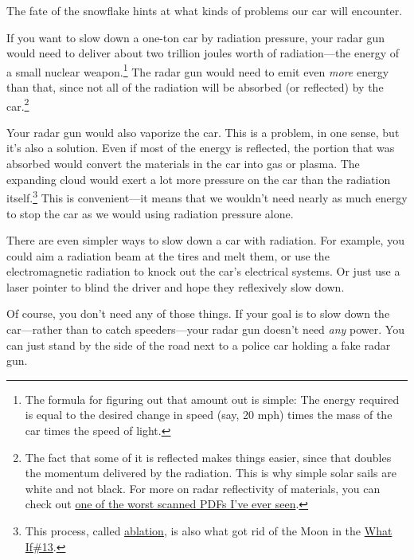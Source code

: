 {{The fate of the snowflake hints at what kinds of problems our car will encounter.}

{If you want to slow down a one-ton car by radiation pressure, your radar gun would need to deliver about two trillion joules worth of radiation—the energy of a small nuclear weapon.{\footnote{The formula for figuring out that amount out is simple: The energy required is equal to the desired change in speed (say, 20 mph) times the mass of the car times the speed of light.} } The radar gun would need to emit even \emph{more} energy than that, since not all of the radiation will be absorbed (or reflected) by the car.{\footnote{The fact that some of it is reflected makes things easier, since that doubles the momentum delivered by the radiation. This is why simple solar sails are white and not black. For more on radar reflectivity of materials, you can check out \href{http://www.dtic.mil/dtic/tr/fulltext/u2/601365.pdf}{one of the worst scanned PDFs I've ever seen}.} } }

{Your radar gun would also vaporize the car. This is a problem, in one sense, but it's also a solution. Even if most of the energy is reflected, the portion that was absorbed would convert the materials in the car into gas or plasma. The expanding cloud would exert a lot more pressure on the car than the radiation itself.{\footnote{This process, called \href{https://en.wikipedia.org/wiki/Laser\_ablation}{ablation}, is also what got rid of the Moon in the \href{http://what-if.xkcd.com/13/} {What If\#13}.} } This is convenient—it means that we wouldn't need nearly as much energy to stop the car as we would using radiation pressure alone.}

{There are even simpler ways to slow down a car with radiation. For example, you could aim a radiation beam at the tires and melt them, or use the electromagnetic radiation to knock out the car's electrical systems. Or just use a laser pointer to blind the driver and hope they reflexively slow down.}

{Of course, you don't need any of those things. If your goal is to slow down the car—rather than to catch speeders—your radar gun doesn't need \emph{any} power. You can just stand by the side of the road next to a police car holding a fake radar gun.}

}

